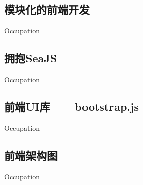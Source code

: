 
\subsection{模块化的前端开发}
\indent
Occupation

\subsection{拥抱SeaJS}
\indent
Occupation

\subsection{前端UI库——bootstrap.js}
\indent
Occupation

\subsection{前端架构图}
\indent
Occupation


\clearpage